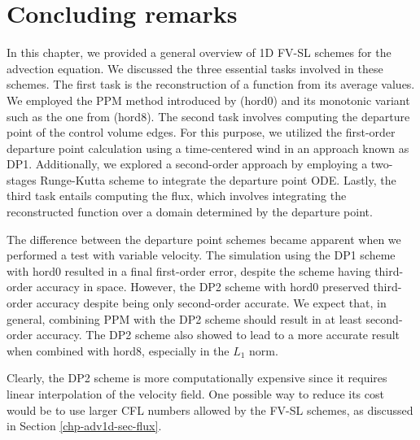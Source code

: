 \section{Concluding remarks}
\label{chp-adv1d-sec-conclusion}
In this chapter, we provided a general overview of 1D FV-SL schemes for the advection equation.
We discussed the three essential tasks involved in these schemes.
The first task is the reconstruction of a function from its average values.
We employed the PPM method introduced by \citet{colella:1984} (hord0) and its monotonic variant such as the one from \citet{lin:2004} (hord8).
The second task involves computing the departure point of the control volume edges. For this purpose, 
we utilized the first-order departure point calculation  using a time-centered wind in an approach known as DP1.
Additionally, we explored a second-order approach by employing a two-stages Runge-Kutta scheme
to integrate the departure point ODE.
Lastly, the third task entails computing the flux, which involves integrating the 
reconstructed function over a domain determined by the departure point.

The difference between the departure point schemes became apparent when we performed a test 
with variable velocity. The simulation using the DP1 scheme with hord0 resulted in a final first-order 
error, despite the scheme having third-order accuracy in space. However, the DP2 scheme  with hord0
preserved third-order accuracy despite being only second-order accurate. We expect that, in 
general, combining PPM with the DP2 scheme should result in at least second-order accuracy.
The DP2 scheme also showed to lead to a more accurate result when combined with hord8, especially in the $L_1$ norm.

Clearly, the DP2 scheme is more computationally expensive since it requires linear interpolation of the velocity field. One possible way to reduce 
its cost would be to use larger CFL numbers allowed by the FV-SL schemes, as discussed in 
Section \ref{chp-adv1d-sec-flux}.
